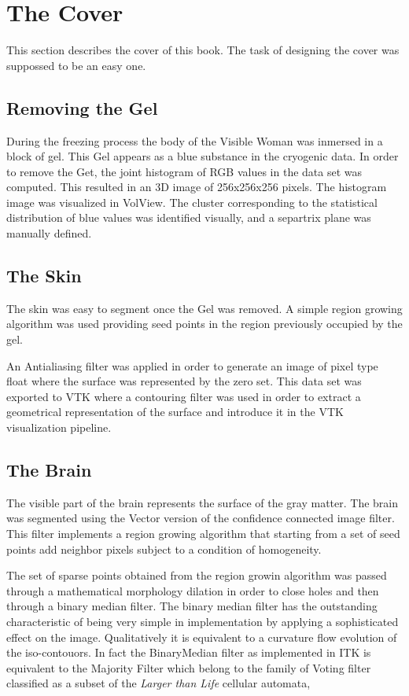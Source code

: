 \chapter*{The Cover}

This section describes the cover of this book. The task of designing the cover
was suppossed to be an easy one. 

\section*{Removing the Gel}
During the freezing process the body of the Visible Woman was inmersed in a
block of gel. This Gel appears as a blue substance in the cryogenic data.  In
order to remove the Get, the joint histogram of RGB values in the data set was
computed. This resulted in an 3D image of 256x256x256 pixels. The histogram
image was visualized in VolView. The cluster corresponding to the statistical
distribution of blue values was identified visually, and a separtrix plane was
manually defined.

\section*{The Skin}
The skin was easy to segment once the Gel was removed. A simple region growing
algorithm was used providing seed points in the region previously occupied by
the gel. 

An Antialiasing filter was applied in order to generate an image of pixel type
float where the surface was represented by the zero set. This data set was
exported to VTK where a contouring filter was used in order to extract a
geometrical representation of the surface and introduce it in the VTK
visualization pipeline.


\section*{The Brain}
The visible part of the brain represents the surface of the gray matter.  The
brain was segmented using the Vector version of the confidence connected image
filter.  This filter implements a region growing algorithm that starting from a
set of seed points add neighbor pixels subject to a condition of homogeneity.

The set of sparse points obtained from the region growin algorithm was passed
through a mathematical morphology dilation in order to close holes and then
through a binary median filter. The binary median filter has the outstanding
characteristic of being very simple in implementation by applying a
sophisticated effect on the image. Qualitatively it is equivalent to a
curvature flow evolution of the iso-contouors. In fact the BinaryMedian filter
as implemented in ITK is equivalent to the Majority Filter which belong to the
family of Voting filter classified as a subset of the \emph{Larger than Life}
cellular automata, 

